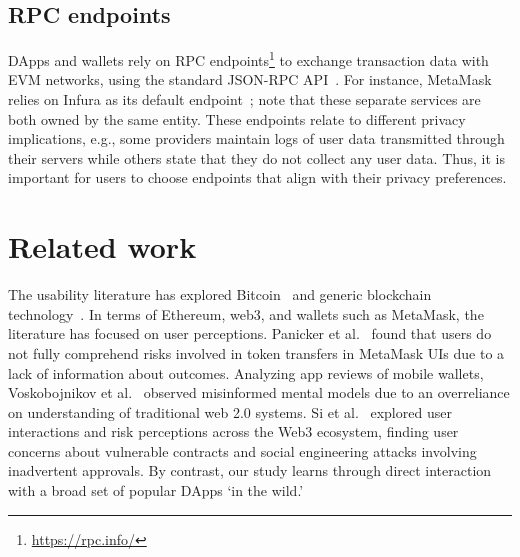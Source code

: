 \documentclass[conference]{IEEEtran}
\begin{document}
\subsection{RPC endpoints}
\label{sec:background:rpc}
DApps and wallets rely on RPC endpoints\footnote{\url{https://rpc.info/}} to exchange transaction data with \ac*{EVM} networks, using the standard JSON-RPC API~\cite{metamaskJsonRpcApi}.
For instance, MetaMask relies on Infura as its default endpoint~\cite{metamaskInfura}; note that these separate services are both owned by the same entity.
These endpoints relate to different privacy implications, e.g., some providers maintain logs of user data transmitted through their servers while others state that they do not collect any user data.
Thus, it is important for users to choose endpoints that align with their privacy preferences.

\section{Related work}

The usability literature has explored Bitcoin~\cite{eskandari2018first,gao2016of,krombholz2017the,mai2020user,sas2017design} and generic blockchain technology~\cite{frohlich2022blockchain,jang2022userExperience,jang2020userPerspectives}. In terms of Ethereum, web3, and wallets such as MetaMask, the literature has focused on user perceptions. 
Panicker et al.~\cite{panicker2024end} found that users do not fully comprehend risks involved in token transfers in MetaMask UIs due to a lack of information about outcomes.
Analyzing app reviews of mobile wallets, Voskobojnikov et al.~\cite{voskobojnikov2021u} observed misinformed mental models due to an overreliance on understanding of traditional web 2.0 systems.
Si et al.~\cite{si2024understanding} explored user interactions and risk perceptions across the Web3 ecosystem, finding user concerns about vulnerable contracts and social engineering attacks involving inadvertent approvals.
By contrast, our study learns through direct interaction with a broad set of popular DApps `in the wild.'
\end{document}
